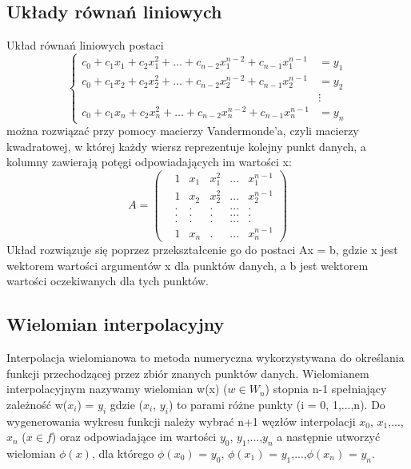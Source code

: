 \documentclass{article}
\begin{document}
\subsection{Układy równań liniowych}
Układ równań liniowych postaci 
\[
\left\{
\begin{aligned}
c_0 + c_1 x_1 + c_2 x_1^2 + \ldots + c_{n-2}x_1^{n-2} + c_{n-1}x_1^{n-1} &= y_1 \\
c_0 + c_1 x_2 + c_2 x_2^2 + \ldots + c_{n-2}x_2^{n-2} + c_{n-1}x_2^{n-1} &= y_2 \\
&\vdots \\
c_0 + c_1 x_n + c_2 x_n^2 + \ldots + c_{n-2}x_n^{n-2} + c_{n-1}x_n^{n-1} &= y_n
\end{aligned}
\right.
\]
można rozwiązać przy pomocy macierzy Vandermonde'a, czyli macierzy kwadratowej, w której każdy wiersz reprezentuje kolejny punkt danych, a kolumny zawierają potęgi odpowiadających im wartości x:
\[
A = \begin{pmatrix}
& 1 & x_1 & x^2_1& ... & x^{n-1}_1\\
& 1 &x_2  & x^2_2 & ... & x^{n-1}_2\\
&. & . &  .& ... & .\\
&. & .& . & ... & . \\
& .& .& .& ... & .\\
& 1 & x_n & .& ...& x^{n-1}_n
\end{pmatrix}
\]
Układ rozwiązuje się poprzez przekształcenie go do postaci Ax = b, gdzie x jest wektorem wartości argumentów x dla punktów danych, a b jest wektorem wartości oczekiwanych dla tych punktów. 
\subsection{Wielomian interpolacyjny}
Interpolacja wielomianowa to metoda numeryczna wykorzystywana do określania funkcji przechodzącej przez zbiór znanych punktów danych. Wielomianem interpolacyjnym nazywamy wielomian w(x) ($w \in W_n$) stopnia n-1 spełniający zależność w($x_i$) = $y_i$ gdzie ($x_i$, $y_i$) to parami różne punkty (i = 0, 1,...,n). Do wygenerowania wykresu funkcji należy wybrać n+1 węzłów interpolacji $x_{0}$, $x_{1}$,...,$x_{n}$ ($x \in f$) oraz odpowiadające im wartości $y_{0}$, $y_{1}$,...,$y_{n}$ a następnie utworzyć wielomian $\phi{(x)}$, dla którego $\phi{(x_0)}$ =  $y_{0}$, $\phi{(x_1)}$ =  $y_{1}$,...,$\phi{(x_n)}$ =  $y_{n}$.
\end{document}
